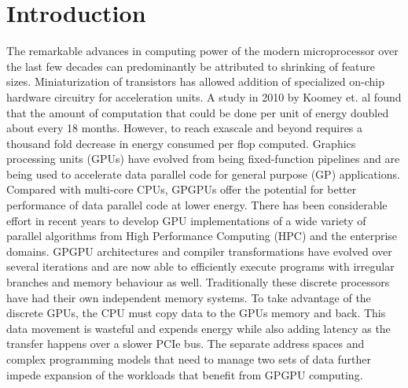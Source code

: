 \chapter{Introduction} \label{chap:introduction}

\par The remarkable advances in computing power of the modern microprocessor over the last few decades can predominantly be attributed to shrinking of feature sizes. Miniaturization of transistors has allowed addition of specialized on-chip hardware circuitry for acceleration units. 
A study in 2010 by Koomey et. al \cite{koomey} found that the amount of computation that could be done per unit of energy doubled about every 18 months. However, to reach exascale and beyond requires a thousand fold decrease in energy consumed per flop computed.
Graphics processing units (GPUs) have evolved from being fixed-function pipelines and are being used to accelerate data parallel code for general purpose (GP) applications. Compared with multi-core CPUs, GPGPUs offer the potential for better performance of data parallel code at lower energy. 
There has been considerable effort in recent years to develop GPU implementations of a wide variety of parallel algorithms from High Performance Computing (HPC) and the enterprise domains. GPGPU architectures and compiler transformations have evolved over several iterations and are now able to efficiently execute programs with irregular branches and memory behaviour as well. 
Traditionally these discrete processors have had their own independent memory systems. To take advantage of the discrete GPUs, the CPU must copy data to the GPUs memory and back. This data movement is wasteful and expends energy while also adding latency as the transfer happens over a slower PCIe bus. The separate address spaces and complex programming models that need to manage two sets of data further impede expansion of the workloads that benefit from GPGPU computing.

